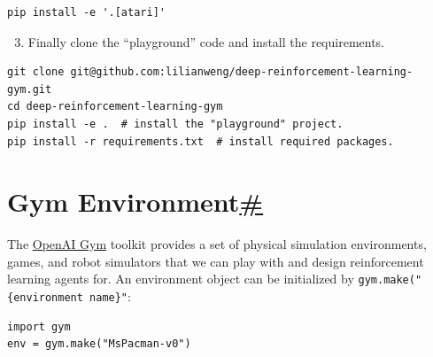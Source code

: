 \begin{verbatim}
pip install -e '.[atari]'
\end{verbatim}

\begin{enumerate}
\setcounter{enumi}{2}
\tightlist
\item
  Finally clone the ``playground'' code and install the requirements.
\end{enumerate}

\begin{verbatim}
git clone git@github.com:lilianweng/deep-reinforcement-learning-gym.git
cd deep-reinforcement-learning-gym
pip install -e .  # install the "playground" project.
pip install -r requirements.txt  # install required packages.
\end{verbatim}

\section{\texorpdfstring{Gym Environment\hyperref[gym-environment]{\#}}{Gym Environment\#}}\label{gym-environment}

The \href{https://gym.openai.com/}{OpenAI Gym} toolkit provides a set of physical simulation environments, games, and robot simulators that we can play with and design reinforcement learning agents for. An environment object can be initialized by \texttt{gym.make("\{environment\ name\}"}:

\begin{verbatim}
import gym
env = gym.make("MsPacman-v0")
\end{verbatim}

